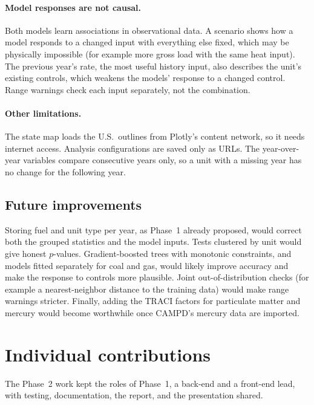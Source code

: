 \documentclass[11pt,a4paper]{article}
\begin{document}
\paragraph{Model responses are not causal.} Both models learn associations in observational data.
A scenario shows how a model responds to a changed input with everything else fixed, which may
be physically impossible (for example more gross load with the same heat input). The previous
year's \NOx{} rate, the most useful history input, also describes the unit's existing controls,
which weakens the models' response to a changed control. Range warnings check each input
separately, not the combination.

\paragraph{Other limitations.} The state map loads the U.S.\ outlines from Plotly's content
network, so it needs internet access. Analysis configurations are saved only as URLs. The
year-over-year variables compare consecutive years only, so a unit with a missing year has no
change for the following year.

\subsection{Future improvements}

Storing fuel and unit type per year, as Phase~1 already proposed, would correct both the grouped
statistics and the model inputs. Tests clustered by unit would give honest $p$-values.
Gradient-boosted trees with monotonic constraints, and models fitted separately for coal and gas,
would likely improve accuracy and make the response to controls more plausible. Joint
out-of-distribution checks (for example a nearest-neighbor distance to the training data) would
make range warnings stricter. Finally, adding the TRACI factors for particulate matter and
mercury would become worthwhile once CAMPD's mercury data are imported.

\section{Individual contributions}
\label{sec:contributions}

The Phase~2 work kept the roles of Phase~1, a back-end and a front-end lead, with testing,
documentation, the report, and the presentation shared.
\end{document}
